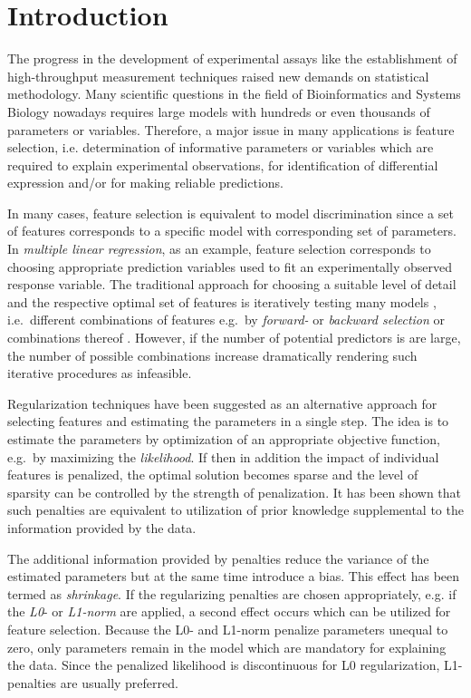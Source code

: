 \documentclass{bioinfo}
\begin{document}
\maketitle

\section{Introduction}
The progress in the development of experimental assays like the establishment of high-throughput measurement techniques raised new demands on statistical methodology. 
Many scientific questions in the field of Bioinformatics and Systems Biology nowadays requires large models with hundreds or even thousands of parameters or variables. 
Therefore, a major issue in many applications is feature selection, i.e. determination of informative parameters or variables which are required to explain experimental observations, for identification of differential expression and/or for making reliable predictions. 

In many cases, feature selection is equivalent to model discrimination \citep{Box67} since a set of features corresponds to a specific model with corresponding set of parameters. 
In \emph{multiple linear regression}, as an example, feature selection corresponds to choosing appropriate prediction variables used to fit an experimentally observed response variable. 
The traditional approach for choosing a suitable level of detail and the respective optimal set of features is iteratively testing many models \citep{Thompson1978}, 
i.e.~different combinations of features e.g.~by \emph{forward-} or \emph{backward selection} or combinations thereof \citep{Hocking1967, Efroymson60}. 
However, if the number of potential predictors is are large, the number of possible combinations increase dramatically rendering such iterative procedures as infeasible. 

Regularization techniques have been suggested as an alternative approach for selecting features and estimating the parameters in a single step. 
The idea is to estimate the parameters by optimization of an appropriate objective function, e.g.~by maximizing the \emph{likelihood}. 
If then in addition the impact of individual features is penalized, the optimal solution becomes sparse and the level of sparsity can be controlled by the strength of penalization. 
It has been shown that such penalties are equivalent to utilization of prior knowledge supplemental to the information provided by the data. 

The additional information provided by penalties reduce the variance of the estimated parameters but at the same time introduce a bias. This effect has been termed as \emph{shrinkage}. 
If the regularizing penalties are chosen appropriately, e.g. if the \emph{L0}- or \emph{L1-norm} are applied, a second effect occurs which can be utilized for feature selection. 
Because the L0- and L1-norm penalize parameters unequal to zero, only parameters remain in the model which are mandatory for explaining the data. 
Since the penalized likelihood is discontinuous for L0 regularization, L1-penalties are usually preferred.
\end{document}
